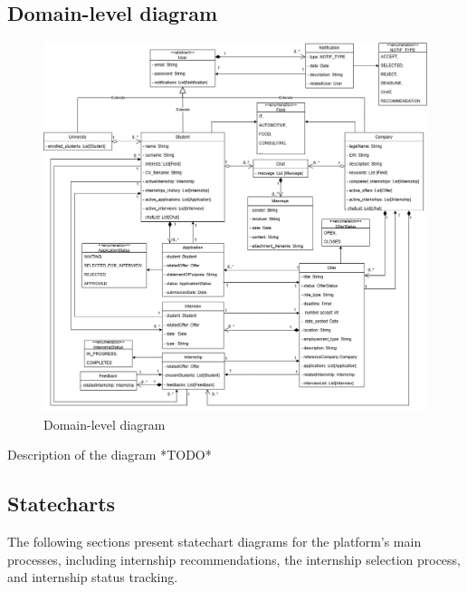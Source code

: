 \subsection{Domain-level diagram}\label{subsec:domain_level_diagram}
\begin{figure}[H]
    \centering
    \includegraphics[width=1\textwidth]{Images/UML_Class_diagram.png}
    \caption{Domain-level diagram}\label{fig:domain-lebel_diagram}
\end{figure}
Description of the diagram *TODO*

\subsection{Statecharts}\label{subsec:statecharts}
The following sections present statechart diagrams for the platform's main processes, including internship recommendations, the internship 
selection process, and internship status tracking. 

